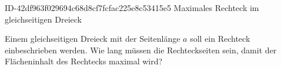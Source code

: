 \begin{exercise}
      {ID-42df963f029694c68d8cf7fcfac225e8c53415e5}
      {Maximales Rechteck im gleichseitigen Dreieck}
  \ifproblem\problem
    \begin{minipage}{0.28\textwidth}
    \end{minipage}%
    \hfill
    \begin{minipage}{0.7\textwidth}
      Einem gleichseitigen Dreieck mit der Seitenlänge $a$ soll ein Rechteck
      einbeschrieben werden. Wie lang müssen die Rechteckseiten sein, damit der
      Flächeninhalt des Rechtecks maximal wird?
    \end{minipage}
  \fi
\end{exercise}
